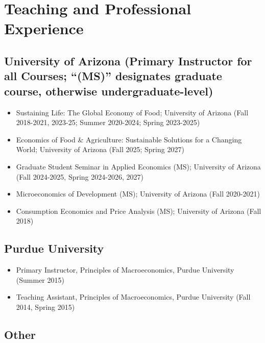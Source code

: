 \documentclass[letterpaper]{article}
\begin{document}
\section*{Teaching and Professional Experience}

\subsection*{University of Arizona \footnotesize (Primary Instructor for all Courses; ``(MS)'' designates graduate course, otherwise undergraduate-level)}

\begin{itemize}

	\item Sustaining Life: The Global Economy of Food; University of Arizona (Fall 2018-2021, 2023-25; Summer 2020-2024; Spring 2023-2025)

    \item Economics of Food \& Agriculture: Sustainable Solutions for a Changing World; University of Arizona (Fall 2025; Spring 2027)
	
	\item Graduate Student Seminar in Applied Economics (MS); University of Arizona (Fall 2024-2025, Spring 2024-2026, 2027)
	
	\item Microeconomics of Development (MS); University of Arizona (Fall 2020-2021)

	\item Consumption Economics and Price Analysis (MS); University of Arizona (Fall 2018)

\end{itemize}

\subsection*{Purdue University}

\begin{itemize}

\item Primary Instructor, Principles of Macroeconomics, Purdue University (Summer 2015)

\item Teaching Assistant, Principles of Macroeconomics, Purdue University (Fall 2014, Spring 2015)	 

\end{itemize}


\subsection*{Other}
\end{document}
